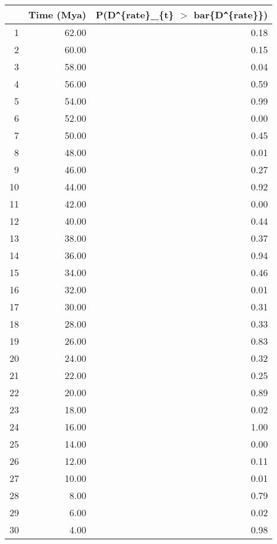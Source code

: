\begin{table}[ht]
\centering
\begin{tabular}{rrr}
  \hline
 & Time (Mya) & P(D\verb|^|\{rate\}\_\{t\} $>$ bar\{D\verb|^|\{rate\}\}) \\ 
  \hline
1 & 62.00 & 0.18 \\ 
  2 & 60.00 & 0.15 \\ 
  3 & 58.00 & 0.04 \\ 
  4 & 56.00 & 0.59 \\ 
  5 & 54.00 & 0.99 \\ 
  6 & 52.00 & 0.00 \\ 
  7 & 50.00 & 0.45 \\ 
  8 & 48.00 & 0.01 \\ 
  9 & 46.00 & 0.27 \\ 
  10 & 44.00 & 0.92 \\ 
  11 & 42.00 & 0.00 \\ 
  12 & 40.00 & 0.44 \\ 
  13 & 38.00 & 0.37 \\ 
  14 & 36.00 & 0.94 \\ 
  15 & 34.00 & 0.46 \\ 
  16 & 32.00 & 0.01 \\ 
  17 & 30.00 & 0.31 \\ 
  18 & 28.00 & 0.33 \\ 
  19 & 26.00 & 0.83 \\ 
  20 & 24.00 & 0.32 \\ 
  21 & 22.00 & 0.25 \\ 
  22 & 20.00 & 0.89 \\ 
  23 & 18.00 & 0.02 \\ 
  24 & 16.00 & 1.00 \\ 
  25 & 14.00 & 0.00 \\ 
  26 & 12.00 & 0.11 \\ 
  27 & 10.00 & 0.01 \\ 
  28 & 8.00 & 0.79 \\ 
  29 & 6.00 & 0.02 \\ 
  30 & 4.00 & 0.98 \\ 
   \hline
\end{tabular}
\label{tab:rate_peak}
\end{table}
